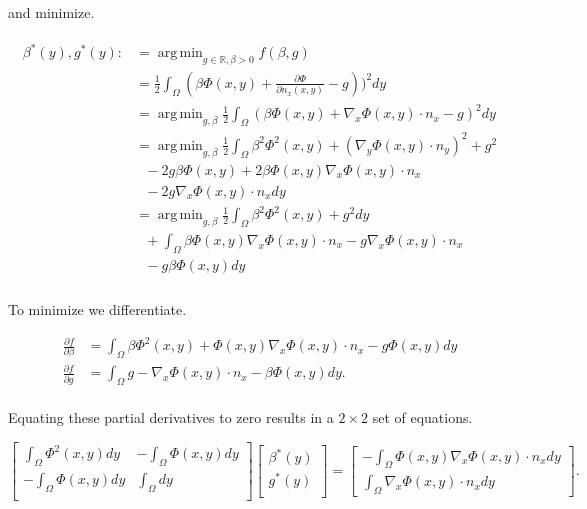 \documentclass[paper=a4, fontsize=11pt]{scrartcl} %
\DeclareMathOperator*{\argmin}{arg\,min}
\numberwithin{equation}{section} %
\numberwithin{figure}{section} %
\numberwithin{table}{section} %
\begin{document}
and minimize.

\begin{align}
  \begin{split}
    \beta^{*}(y), g^{*}(y) :&= \argmin_{g \in \mathbb{R}, \beta > 0} f(\beta,g ) \\
    &=\frac{1}{2} \int_{\Omega} ( \beta \Phi(x,y) + \frac{\partial \Phi}{\partial n_{x}(x,y)} - g))^{2} dy \\
    &= \argmin_{g, \beta } \frac{1}{2} \int_{\Omega} ( \beta \Phi(x,y) + \nabla_{x} \Phi(x,y) \cdot n_{x} - g)^{2} dy\\
    &= \argmin_{g, \beta } \frac{1}{2} \int_{\Omega} \beta^2 \Phi^2(x,y) + (\nabla_{y} \Phi(x,y) \cdot n_{y})^2 + g^2\\
    &\ \ \ - 2g\beta\Phi(x,y) + 2\beta \Phi(x,y)\nabla_{x} \Phi(x,y) \cdot n_{x} \\
    &\ \ \ - 2g\nabla_{x} \Phi(x,y) \cdot n_{x} dy \\
    &= \argmin_{g, \beta } \frac{1}{2} \int_{\Omega} \beta^2 \Phi^2(x,y) +  g^2dy\\
    &\ \ \ + \int_{\Omega} \beta \Phi(x,y)\nabla_{x} \Phi(x,y) \cdot n_{x} -g\nabla_{x} \Phi(x,y) \cdot n_{x}\\
    &\ \ \ -g\beta\Phi(x,y) dy \\
  \end{split}
\end{align}

To minimize we differentiate.

\begin{align*}
  \frac{\partial f}{\partial \beta} &= \int_{\Omega} \beta\Phi^2(x,y) + \Phi(x,y)\nabla_{x} \Phi(x,y) \cdot n_{x} -g\Phi(x,y) dy\\
  \frac{\partial f}{\partial g} &= \int_{\Omega} g - \nabla_{x} \Phi(x,y) \cdot n_{x} -\beta\Phi(x,y) dy. \\
\end{align*}

Equating these partial derivatives to zero results in a $2\times 2$ set of equations.

\[
\begin{bmatrix}
  \int_{\Omega}\Phi^2(x,y) dy & -\int_{\Omega} \Phi(x,y) dy \\
  -\int_{\Omega}\Phi(x,y) dy    & \int_{\Omega}dy \\
\end{bmatrix}
\begin{bmatrix}
  \beta^{*}(y) \\
  g^{*}(y) \\
\end{bmatrix}
=
\begin{bmatrix}
  -\int_{\Omega} \Phi(x,y) \nabla_{x}\Phi(x,y) \cdot n_{x} dy \\
  \int_{\Omega} \nabla_{x}\Phi(x,y) \cdot n_{x}dy
\end{bmatrix}.
\]
\end{document}
